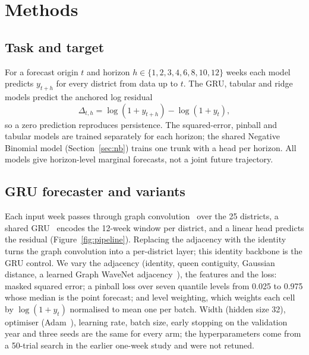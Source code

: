 \section{Methods}
\label{sec:methods}

\subsection{Task and target}
For a forecast origin $t$ and horizon $h\in\{1,2,3,4,6,8,10,12\}$ weeks each model predicts $y_{t+h}$ for every district from data up to $t$. The GRU, tabular and ridge models predict the anchored log residual
\[
\Delta_{t,h}=\log(1+y_{t+h})-\log(1+y_t),
\]
so a zero prediction reproduces persistence. The squared-error, pinball and tabular models are trained separately for each horizon; the shared Negative Binomial model (Section~\ref{sec:nb}) trains one trunk with a head per horizon. All models give horizon-level marginal forecasts, not a joint future trajectory.

\subsection{GRU forecaster and variants}
Each input week passes through graph convolution~\cite{kipf2017gcn} over the 25 districts, a shared GRU~\cite{cho2014gru} encodes the 12-week window per district, and a linear head predicts the residual (Figure~\ref{fig:pipeline}). Replacing the adjacency with the identity turns the graph convolution into a per-district layer; this identity backbone is the GRU control. We vary the adjacency (identity, queen contiguity, Gaussian distance, a learned Graph WaveNet adjacency~\cite{wu2019graph}), the features and the loss: masked squared error; a pinball loss over seven quantile levels from 0.025 to 0.975 whose median is the point forecast; and level weighting, which weights each cell by $\log(1+y_t)$ normalised to mean one per batch. Width (hidden size 32), optimiser (Adam~\cite{kingma2015adam}), learning rate, batch size, early stopping on the validation year and three seeds are the same for every arm; the hyperparameters come from a 50-trial search in the earlier one-week study and were not retuned.

